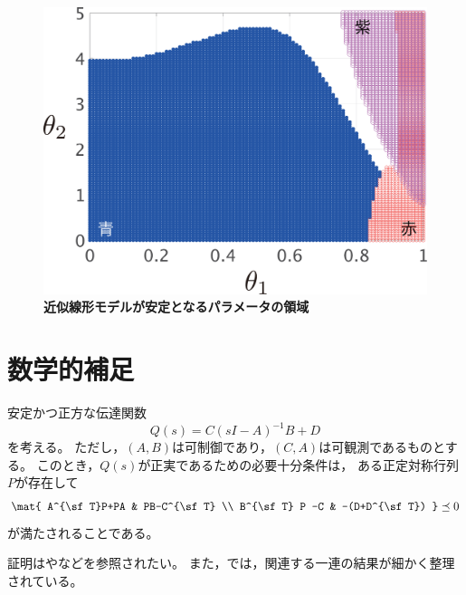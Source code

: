 \documentclass[tombow,dvipdfmx]{corona-a5-1.1}
\begin{document}
\begin{figure}[t!]
{\begin{minipage}{0.49\linewidth}
    \medskip
  \end{minipage}
  \begin{minipage}{0.49\linewidth}
    \centering
    \includegraphics[width = 0.90\linewidth]{figs/Y0.01D0.01X}
    \medskip
  \end{minipage}
}
 \caption{\textbf{近似線形モデルが安定となるパラメータの領域}}
 \label{fig:stacheckX}
\medskip
\end{figure}



\section*{数学的補足}

\begin{補題}\label{lem:prlem}
安定かつ正方な伝達関数
\[
Q(s)=C(sI-A)^{-1}B + D
\]
を考える。
ただし，$(A,B)$は可制御であり，$(C,A)$は可観測であるものとする。
このとき，$Q(s)$が正実であるための必要十分条件は，
ある正定対称行列$P$が存在して
\begin{align*}%
\mat{
A^{\sf T}P+PA & PB-C^{\sf T} \\
B^{\sf T} P -C & -(D+D^{\sf T})
}\preceq 0
\end{align*}
が満たされることである。
\end{補題}

証明は\cite[Theorem 5.31]{antoulas2005approximation}や\cite[Theorem 3]{anderson1967system}などを参照されたい。
また，\cite{kottenstette2010relationships}では，関連する一連の結果が細かく整理されている。
\end{document}
